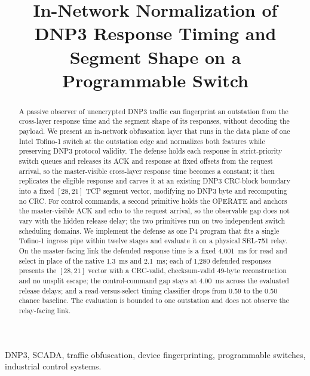 \documentclass[conference]{IEEEtran}
\begin{document}
\title{In-Network Normalization of DNP3 Response Timing and
Segment Shape on a Programmable Switch}

\author{
}

\maketitle

\begin{abstract}
A passive observer of unencrypted DNP3 traffic can fingerprint an outstation from the cross-layer
response time and the segment shape of its responses, without decoding the payload. We present an in-network obfuscation layer that runs in the data plane of one Intel Tofino-1 switch at
the outstation edge and normalizes both features while preserving DNP3 protocol validity. The defense
holds each response in strict-priority switch queues and releases its ACK and response at fixed offsets
from the request arrival, so the master-visible cross-layer response time becomes a constant; it then
replicates the eligible response and carves it at an existing DNP3 CRC-block boundary into a fixed
$[28,21]$ TCP segment vector, modifying no DNP3 byte and recomputing no CRC. For control commands, a
second primitive holds the OPERATE and anchors the master-visible ACK and echo to the request arrival,
so the observable gap does not vary with the hidden release delay; the two primitives run on two
independent switch scheduling domains. We implement the defense as one P4 program that fits a single
Tofino-1 ingress pipe within twelve stages and evaluate it on a physical SEL-751 relay. On the
master-facing link the defended response time is a fixed 4.001~ms for read and select in place of the
native 1.3~ms and 2.1~ms; each of 1{,}280 defended responses presents the $[28,21]$ vector with a
CRC-valid, checksum-valid 49-byte reconstruction and no unsplit escape; the control-command gap stays
at 4.00~ms across the evaluated release delays; and a read-versus-select timing classifier drops from
0.59 to the 0.50 chance baseline. The evaluation is bounded to one outstation and does not observe the
relay-facing link.
\end{abstract}

\begin{IEEEkeywords}
DNP3, SCADA, traffic obfuscation, device fingerprinting, programmable switches, industrial control
systems.
\end{IEEEkeywords}









\end{document}
